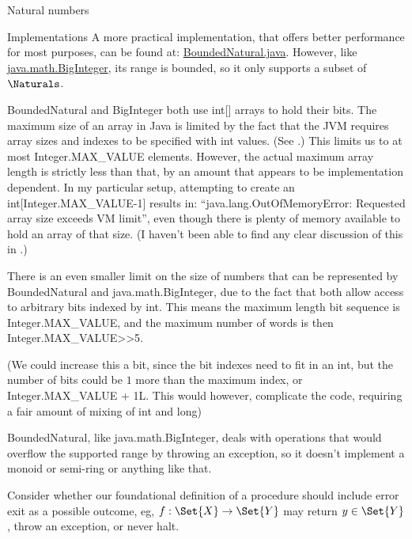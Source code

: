 \documentclass[12pt]{PalisadesLakesBook}
\begin{document}
\begin{plSection}{Natural numbers}
\begin{plSection}{Implementations}
A more practical implementation,
that offers better performance for most purposes,
can be found at: 
\href{https://github.com/palisades-lakes/nzqr/blob/main/src/main/java/nzqr/java/numbers/BoundedNatural.java}
{\javaFont BoundedNatural.java}.
However, 
like \href{https://github.com/openjdk/jdk/blob/master/src/java.base/share/classes/java/math/BigInteger.java}
{\javaFont java.math.BigInteger},
its range is bounded, so it only supports a subset of $\Naturals$.

{\javaFont BoundedNatural} and {\javaFont BigInteger}
both use {\javaFont int[]} arrays to hold their bits.
The maximum size of an array in Java is limited
by the fact that the JVM 
requires array sizes and indexes to be specified 
with {\javaFont int} values.
(See .)
This limits us to at most {\javaFont Integer.MAX\_VALUE} elements.
However, the actual maximum array length is strictly less than that,
by an amount that appears to be implementation dependent.
In my particular setup, attempting to create an 
{\javaFont int[Integer.MAX\_VALUE-1]} results in:
``{\javaFont java.lang.OutOfMemoryError: 
Requested array size exceeds VM limit}'',
even though there is plenty of memory available to hold 
an array of that size.
(I haven't been able to find any clear discussion of this in
.)

There is an even smaller limit on the size of numbers that can be
represented by {\javaFont BoundedNatural} and 
{\javaFont java.math.BigInteger},
due to the fact that both allow access to arbitrary bits
indexed by {\javaFont int}.
This means the maximum length bit sequence is 
{\javaFont Integer.MAX\_VALUE},
and the maximum number of words is then
{\javaFont Integer.MAX\_VALUE>>5}.

(We could increase this a bit, since the bit indexes need to fit
in an {\javaFont int}, but the number of bits could be $1$ more
than the maximum index, or {\javaFont Integer.MAX\_VALUE + 1L}.
This would however, complicate the code, requiring a fair amount
of mixing of {\javaFont int} and {\javaFont long})

{\javaFont BoundedNatural}, like {\javaFont java.math.BigInteger},
deals with operations that would overflow the supported range
by throwing an exception, 
so it doesn't implement a monoid or semi-ring 
or anything like that.

\TODO Consider whether our foundational definition of a procedure
should include error exit as a possible outcome, eg,
$ f : \Set{X} \rightarrow \Set{Y}$ may
return $y\in \Set{Y}$, throw an exception,
or never halt.


\end{plSection}
\end{plSection}
\end{document}
